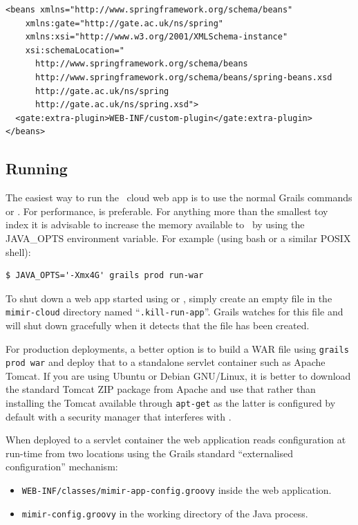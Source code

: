 \begin{lstlisting}
<beans xmlns="http://www.springframework.org/schema/beans"
    xmlns:gate="http://gate.ac.uk/ns/spring"
    xmlns:xsi="http://www.w3.org/2001/XMLSchema-instance"
    xsi:schemaLocation="
      http://www.springframework.org/schema/beans
      http://www.springframework.org/schema/beans/spring-beans.xsd
      http://gate.ac.uk/ns/spring
      http://gate.ac.uk/ns/spring.xsd">
  <gate:extra-plugin>WEB-INF/custom-plugin</gate:extra-plugin>
</beans>
\end{lstlisting}

\subsection{Running}

The easiest way to run the \Mimir\ cloud web app is to use the normal Grails
commands  or .  For performance,
 is preferable.  For anything more than the smallest
toy index it is advisable to increase the memory available to \Mimir\ by using
the JAVA\_OPTS environment variable.  For example (using bash or a similar POSIX
shell):
\begin{verbatim}
$ JAVA_OPTS='-Xmx4G' grails prod run-war
\end{verbatim}

To shut down a web app started using  or , simply create an empty file in the {\tt mimir-cloud} directory named
``{\tt .kill-run-app}''.  Grails watches for this file and will shut down
gracefully when it detects that the file has been created.

For production deployments, a better option is to build a WAR file using
{\tt grails prod war} and deploy that to a standalone servlet container such as
Apache Tomcat.  If you are using Ubuntu or Debian GNU/Linux, it is better to
download the standard Tomcat ZIP package from Apache and use that rather than
installing the Tomcat available through {\tt apt-get} as the latter is
configured by default with a security manager that interferes with \Mimir.

When deployed to a servlet container the web application reads configuration
at run-time from two locations using the Grails standard ``externalised
configuration'' mechanism:
\begin{itemize}
\item {\tt WEB-INF/classes/mimir-app-config.groovy} inside the web application.
\item {\tt mimir-config.groovy} in the working directory of the Java process.
\end{itemize}


